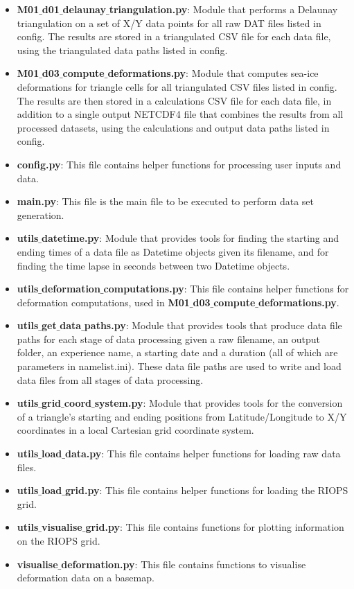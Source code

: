 \documentclass[12pt]{article}
\begin{document}
\begin{itemize}
    \item \textbf{M01$\_$d01$\_$delaunay$\_$triangulation.py}: Module that performs a Delaunay triangulation on a set of X/Y data points for all raw DAT files listed in config. The results are stored in a triangulated CSV file for each data file, using the triangulated data paths listed in config.
    \item \textbf{M01$\_$d03$\_$compute$\_$deformations.py}: Module that computes sea-ice deformations for triangle cells for all triangulated CSV files listed in config. The results are then
    stored in a calculations CSV file for each data file, in addition to a single output NETCDF4 file that combines the results from all processed datasets, using the calculations and output data paths listed in config.
    \item \textbf{config.py}: This file contains helper functions for processing user inputs and data.
    \item \textbf{main.py}: This file is the main file to be executed to perform data set generation.
    \item \textbf{utils$\_$datetime.py}: Module that provides tools for finding the starting and ending times of a data file as Datetime objects given its filename, and for finding the time lapse in seconds between two Datetime objects.
    \item \textbf{utils$\_$deformation$\_$computations.py}: This file contains helper functions for deformation computations, used in \textbf{M01$\_$d03$\_$compute$\_$deformations.py}.
    \item \textbf{utils$\_$get$\_$data$\_$paths.py}: Module that provides tools that produce data file paths for each stage of data processing given a raw filename, an output folder, an experience name, a starting date and a duration (all of which are parameters in namelist.ini). These data file paths are used to write and load data files from all stages of data processing.
    \item \textbf{utils$\_$grid$\_$coord$\_$system.py}: Module that provides tools for the conversion of a triangle’s starting and ending positions from Latitude/Longitude to X/Y coordinates in a local Cartesian grid coordinate system.
    \item \textbf{utils$\_$load$\_$data.py}: This file contains helper functions for loading raw data files.
    \item \textbf{utils$\_$load$\_$grid.py}: This file contains helper functions for loading the RIOPS grid.
    \item \textbf{utils$\_$visualise$\_$grid.py}: This file contains functions for plotting information on the RIOPS grid.
    \item \textbf{visualise$\_$deformation.py}: This file contains functions to visualise deformation data on a basemap.
\end{itemize}
\end{document}
